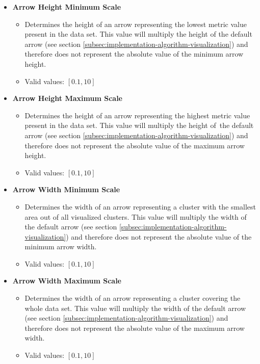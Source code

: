 \begin{itemize}
\item {\bf Arrow Height Minimum Scale}
	\begin{itemize}
		\item Determines the height of an arrow representing the lowest metric value present in the data set. This value will multiply the height of the default arrow (see section \ref{subsec:implementation-algorithm-visualization}) and therefore does not represent the absolute value of the minimum arrow height.
		\item Valid values: \([0.1,10]\)
	\end{itemize}  

\item {\bf Arrow Height Maximum Scale}
	\begin{itemize}
		\item Determines the height of an arrow representing the highest metric value present in the data set. This value will multiply the height of~the default arrow (see section \ref{subsec:implementation-algorithm-visualization}) and therefore does not represent the absolute value of the maximum arrow height.
		\item Valid values: \([0.1,10]\)
	\end{itemize}

\item {\bf Arrow Width Minimum Scale}
	\begin{itemize}
		\item Determines the width of an arrow representing a cluster with the smallest area out of all visualized clusters. This value will multiply the width of the default arrow (see section \ref{subsec:implementation-algorithm-visualization}) and therefore does not represent the absolute value of the minimum arrow width.
		\item Valid values: \([0.1,10]\)
	\end{itemize}

\item {\bf Arrow Width Maximum Scale}
	\begin{itemize}
		\item Determines the width of an arrow representing a cluster covering the whole data set. This value will multiply the width of the default arrow (see section \ref{subsec:implementation-algorithm-visualization}) and therefore does not represent the absolute value of the maximum arrow width.
		\item Valid values: \([0.1,10]\)
	\end{itemize}


\end{itemize}
